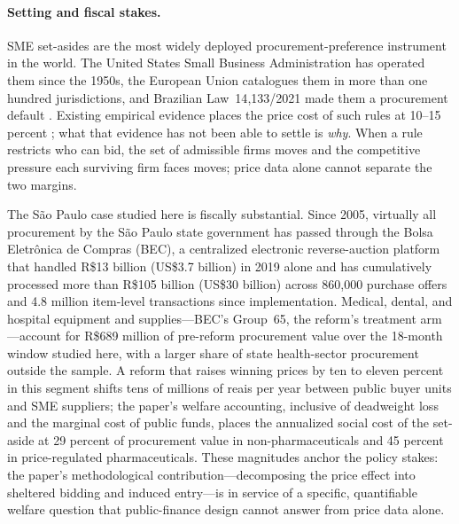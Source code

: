 \paragraph{Setting and fiscal stakes.} SME set-asides are the most widely deployed procurement-preference instrument in the world. The United States Small Business Administration has operated them since the 1950s, the European Union catalogues them in more than one hundred jurisdictions, and Brazilian Law~14{,}133/2021 made them a procurement default \citep{bastos2018, thai2017, bosio2022}. Existing empirical evidence places the price cost of such rules at 10--15 percent \citep{marion2007, krasnokutskaya2011, athey2013, nakabayashi2013}; what that evidence has not been able to settle is \emph{why}. When a rule restricts who can bid, the set of admissible firms moves and the competitive pressure each surviving firm faces moves; price data alone cannot separate the two margins.

The S\~ao Paulo case studied here is fiscally substantial. Since 2005, virtually all procurement by the S\~ao Paulo state government has passed through the Bolsa Eletr\^onica de Compras (BEC), a centralized electronic reverse-auction platform that handled R\$13 billion (US\$3.7 billion) in 2019 alone and has cumulatively processed more than R\$105 billion (US\$30 billion) across 860{,}000 purchase offers and 4.8 million item-level transactions since implementation. Medical, dental, and hospital equipment and supplies---BEC's Group~65, the reform's treatment arm---account for R\$689 million of pre-reform procurement value over the 18-month window studied here, with a larger share of state health-sector procurement outside the sample. A reform that raises winning prices by ten to eleven percent in this segment shifts tens of millions of reais per year between public buyer units and SME suppliers; the paper's welfare accounting, inclusive of deadweight loss and the marginal cost of public funds, places the annualized social cost of the set-aside at 29 percent of procurement value in non-pharmaceuticals and 45 percent in price-regulated pharmaceuticals. These magnitudes anchor the policy stakes: the paper's methodological contribution---decomposing the price effect into sheltered bidding and induced entry---is in service of a specific, quantifiable welfare question that public-finance design cannot answer from price data alone.

